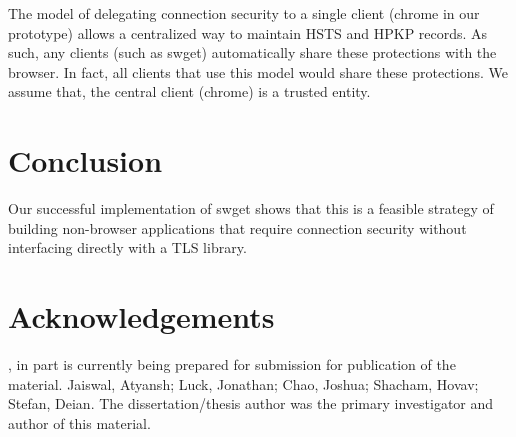 The model of delegating connection security to a single client (chrome in our
prototype) allows a centralized way to maintain HSTS and HPKP records. As such,
any clients (such as swget) automatically share these protections with the
browser. In fact, all clients that use this model would share these
protections. We assume that, the central client (chrome) is a trusted entity.

\section{Conclusion}
\label{sec:conclusion-saber}

Our successful implementation of swget shows that this is a feasible strategy
of building non-browser applications that require connection security without
interfacing directly with a TLS library.

\section{Acknowledgements}
\label{sec:acknowledgement-saber}
, in part is currently being prepared for submission for
publication of the material. Jaiswal, Atyansh; Luck, Jonathan; Chao, Joshua;
Shacham, Hovav; Stefan, Deian. The dissertation/thesis author was the primary
investigator and author of this material.
